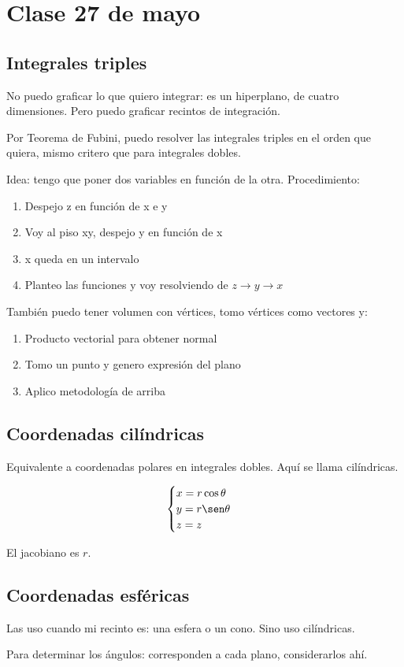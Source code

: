 \section{Clase 27 de mayo}

\subsection{Integrales triples}

No puedo graficar lo que quiero integrar:
es un hiperplano, de cuatro dimensiones.
Pero puedo graficar recintos de integración.

Por Teorema de Fubini,
puedo resolver las integrales triples en el orden que quiera,
mismo critero que para integrales dobles.

Idea: tengo que poner dos variables en función de la otra.
Procedimiento:
\begin{enumerate}
    \item Despejo z en función de x e y
    \item Voy al piso xy, despejo y en función de x
    \item x queda en un intervalo
    \item Planteo las funciones y voy resolviendo de \(z\to y\to x\)
\end{enumerate}

También puedo tener volumen con vértices,
tomo vértices como vectores y:
\begin{enumerate}
    \item Producto vectorial para obtener normal
    \item Tomo un punto y genero expresión del plano
    \item Aplico metodología de arriba
\end{enumerate}

\subsection{Coordenadas cilíndricas}

Equivalente a coordenadas polares en integrales dobles.
Aquí se llama cilíndricas.

\begin{align*}
    \begin{cases}
        x = r \cos\theta \\
        y = r \sen\theta \\
        z = z
    \end{cases}
\end{align*}

El jacobiano es \(r\).

\subsection{Coordenadas esféricas}

Las uso cuando mi recinto es:
una esfera o un cono.
Sino uso cilíndricas.

Para determinar los ángulos:
corresponden a cada plano,
considerarlos ahí.
